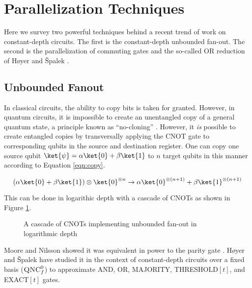 \section{Parallelization Techniques}
\label{sec:parallel}

Here we survey two powerful techniques behind a recent trend of work on
constant-depth circuits. The first is the constant-depth unbounded fan-out.
The second is the parallelization of
commuting gates and the so-called OR reduction of H{\o}yer and {\v S}palek
\cite{Hoyer2002}.

\subsection{Unbounded Fanout}

In classical
circuits, the ability to copy bits is taken for granted. However,
in quantum circuits,
it is impossible to create an unentangled copy of a general quantum state, a
principle known as ``no-cloning'' \cite{Nielsen2000}. However,
it \emph{is} possible to create entangled copies by transversally applying
the CNOT gate to corresponding qubits in the source and destination register.
One can copy one source qubit $\ket{\psi} = \alpha \ket{0} + \beta \ket{1}$
to $n$ target qubits in this manner according to Equation \ref{eqn:copy}.

\begin{equation}
(\alpha \ket{0} + \beta \ket{1}) \otimes \ket{0}^{\otimes n} \rightarrow
\alpha \ket{0}^{\otimes (n+1)} + \beta \ket{1}^{\otimes (n+1)}
\end{equation}

This can be done in logarithic depth with a cascade of CNOTs as shown
in Figure \ref{fig:cnot-cascade}.

\begin{figure}
\label{fig:cnot-cascade}
\caption{A cascade of CNOTs implementing unbounded fan-out in logarithmic depth}
\end{figure}

Moore and Nilsson showed it was equivalent in power to the parity gate
\cite{Moore1998}. H{\o}yer and {\v S}palek have studied it in the
context of constant-depth circuits over a fixed basis ($\textsc{QNC}_f^0$)
to approximate AND, OR, MAJORITY, THRESHOLD$[t]$, and EXACT$[t]$ gates.

